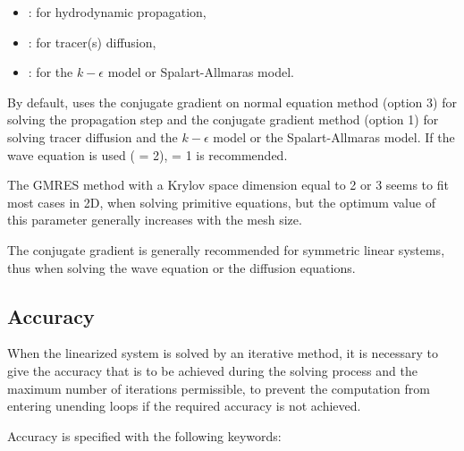 \begin{itemize}
\item {}: for hydrodynamic propagation,

\item {}: for tracer(s) diffusion,

\item {}:
for the $k-\epsilon$ model or Spalart-Allmaras model.
\end{itemize}

By default,  uses the conjugate gradient on normal equation method
(option 3) for solving the propagation step
and the conjugate gradient method (option 1) for solving tracer diffusion and
the $k-\epsilon$ model or the Spalart-Allmaras model.
If the wave equation is used ( = 2),
 = 1 is recommended.

The GMRES method with a Krylov space dimension equal to 2 or 3 seems
to fit most cases in 2D, when solving primitive equations,
but the optimum value of this parameter generally increases with the mesh size.

The conjugate gradient is generally recommended for symmetric linear systems,
thus when solving the wave equation or the diffusion equations.


\subsection{Accuracy}

When the linearized system is solved by an iterative method, it is necessary
to give the accuracy that is to be achieved during the solving process and
the maximum number of iterations permissible, to prevent the computation
from entering unending loops if the required accuracy is not achieved.

Accuracy is specified with the following keywords:

